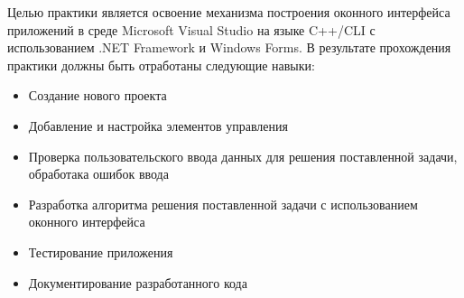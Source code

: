\intro

Целью практики является освоение механизма построения оконного интерфейса приложений в среде Microsoft Visual Studio на языке C++/CLI с использованием .NET Framework и Windows Forms. В результате прохождения практики должны быть отработаны следующие навыки:

\begin{itemize}
    \item{Создание нового проекта}
    \item{Добавление и настройка элементов управления}
    \item{Проверка пользовательского ввода данных для решения поставленной задачи, обработака ошибок ввода}
    \item{Разработка алгоритма решения поставленной задачи с использованием оконного интерфейса}
    \item{Тестирование приложения}
    \item{Документирование разработанного кода}
\end{itemize}
